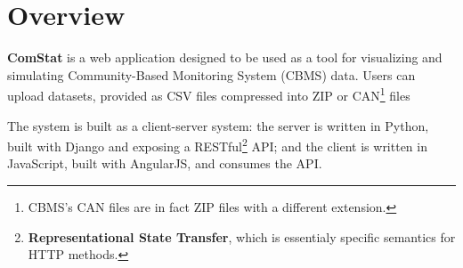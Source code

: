 
\section{Overview}

\textbf{ComStat} is a web application designed to be used as a tool for visualizing and simulating Community-Based Monitoring System (CBMS) data. Users can upload datasets, provided as CSV files compressed into ZIP or
CAN\footnote{CBMS's CAN files are in fact ZIP files with a different extension.}
files

The system is built as a client-server system: the server is written in Python, built with Django and exposing a
RESTful\footnote{\textbf{Representational State Transfer}, which is essentialy specific semantics for HTTP methods.}
API; and the client is written in JavaScript, built with AngularJS, and consumes the API.



